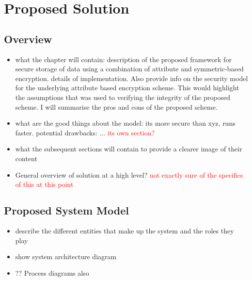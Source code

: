 \chapter{Proposed Solution}
\label{chap:proposed_solution}

\renewcommand{\theenumi}{\Alph{enumi}}
\renewcommand{\theenumii}{\roman{enumii}}

\section{Overview}

\begin{itemize}
	\item what the chapter will contain: description of the proposed framework for secure storage of data using a combination of attribute and symmetric-based encryption.  details of implementation. Also provide info on the security model for the underlying attribute based encryption scheme. This would highlight the assumptions that was used to verifying the integrity of the proposed scheme. I will summarise the pros and cons of the proposed scheme.
	
	\item what are the good things about the model: its more secure than xyz, runs faster. potential drawbacks: ... \textcolor{red}{its own section?}
	
	\item what the subsequent sections will contain to provide a clearer image of their content
\end{itemize}

\begin{itemize}
	\item General overview of solution at a high level? \textcolor{red}{not exactly sure of the specifics of this at this point}
\end{itemize}

\section{Proposed System Model}

\begin{itemize}
	\item describe the different entities that make up the system and the roles they play
	\item show system architecture diagram
	\item ?? Process diagrams also
\end{itemize}


